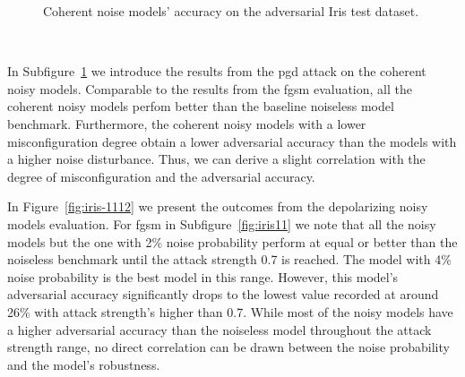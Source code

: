 \begin{figure}[!h]
\begin{subfigure}{0.45\textwidth}
      \label{fig:iris10}
  \end{subfigure}
  \caption{Coherent noise models' accuracy on the adversarial Iris test dataset.}
  \label{fig:iris-910}
\end{figure} \

In Subfigure~\ref{fig:iris10} we introduce the results from the \ac{pgd}
attack on the coherent noisy models. Comparable to the results from the
\ac{fgsm} evaluation, all the coherent noisy models perfom better than
the baseline noiseless model benchmark. Furthermore, the coherent noisy
models with a lower misconfiguration degree obtain a lower adversarial
accuracy than the models with a higher noise disturbance. Thus, we can
derive a slight correlation with the degree of misconfiguration and the
adversarial accuracy. \

In Figure~\ref{fig:iris-1112} we present the outcomes from the depolarizing
noisy models evaluation. For \ac{fgsm} in Subfigure~\ref{fig:iris11}
we note that all the noisy models but the one with 2\% noise probability
perform at equal or better than the noiseless benchmark until the attack
strength 0.7 is reached. The model with 4\% noise probability is the best
model in this range. However, this model's adversarial accuracy significantly
drops to the lowest value recorded at around 26\% with attack strength's
higher than 0.7. While most of the noisy models have a higher adversarial
accuracy than the noiseless model throughout the attack strength range,
no direct correlation can be drawn between the noise probability and the
model's robustness. \


